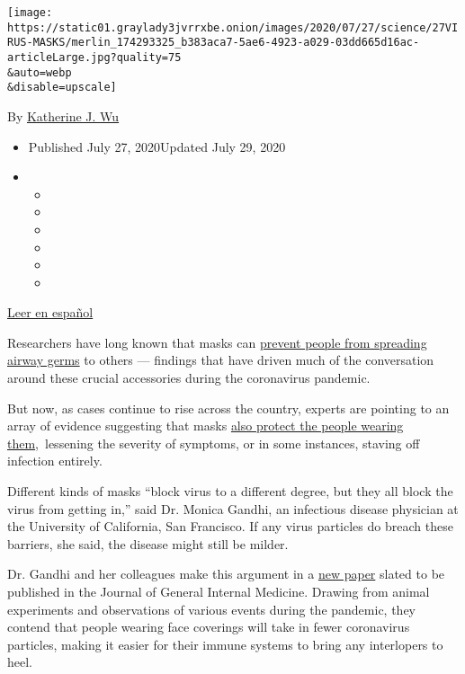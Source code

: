 \texttt{[image: https://static01.graylady3jvrrxbe.onion/images/2020/07/27/science/27VIRUS-MASKS/merlin\_174293325\_b383aca7-5ae6-4923-a029-03dd665d16ac-articleLarge.jpg?quality=75\\\&auto=webp\\\&disable=upscale]}

By
\href{https://www.nytimes3xbfgragh.onion/by/katherine-j--wu}{Katherine
J. Wu}

\begin{itemize}
\item
  Published July 27, 2020Updated July 29, 2020
\item
  \begin{itemize}
  \item
  \item
  \item
  \item
  \item
  \item
  \end{itemize}
\end{itemize}

\href{https://www.nytimes3xbfgragh.onion/es/2020/07/29/espanol/ciencia-y-tecnologia/proteccion-cubrebocas-coronavirus.html}{Leer
en español}

Researchers have long known that masks can
\href{https://journals.plos.org/plospathogens/article?id=10.1371/journal.ppat.1003205}{prevent
people from spreading airway germs} to others --- findings that have
driven much of the conversation around these crucial accessories during
the coronavirus pandemic.

But now, as cases continue to rise across the country, experts are
pointing to an array of evidence suggesting that masks
\href{https://pubmed.ncbi.nlm.nih.gov/23498357/}{also protect the people
wearing them},~lessening the severity of symptoms, or in some instances,
staving off infection entirely.

Different kinds of masks ``block virus to a different degree, but they
all block the virus from getting in,'' said Dr. Monica Gandhi, an
infectious disease physician at the University of California, San
Francisco. If any virus particles do breach these barriers, she said,
the disease might still be milder.

Dr. Gandhi and her colleagues make this argument in a
\href{https://ucsf.app.box.com/s/blvolkp5z0mydzd82rjks4wyleagt036}{new
paper} slated to be published in the Journal of General Internal
Medicine. Drawing from animal experiments and observations of various
events during the pandemic, they contend that people wearing face
coverings will take in fewer coronavirus particles, making it easier for
their immune systems to bring any interlopers to heel.

